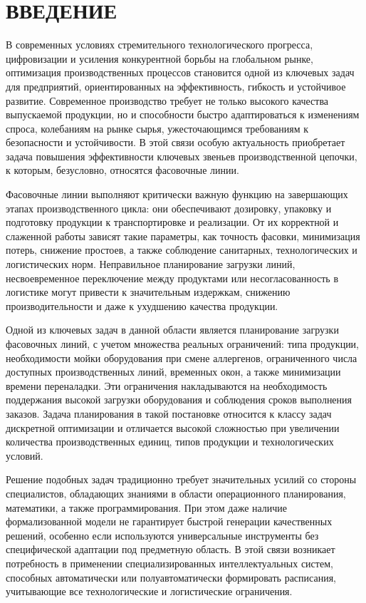 \chapter*{ВВЕДЕНИЕ}

В современных условиях стремительного технологического прогресса, цифровизации и усиления конкурентной борьбы на глобальном рынке, оптимизация производственных процессов становится одной из ключевых задач для предприятий, ориентированных на эффективность, гибкость и устойчивое развитие. Современное производство требует не только высокого качества выпускаемой продукции, но и способности быстро адаптироваться к изменениям спроса, колебаниям на рынке сырья, ужесточающимся требованиям к безопасности и устойчивости. В этой связи особую актуальность приобретает задача повышения эффективности ключевых звеньев производственной цепочки, к которым, безусловно, относятся фасовочные линии.

Фасовочные линии выполняют критически важную функцию на завершающих этапах производственного цикла: они обеспечивают дозировку, упаковку и подготовку продукции к транспортировке и реализации. От их корректной и слаженной работы зависят такие параметры, как точность фасовки, минимизация потерь, снижение простоев, а также соблюдение санитарных, технологических и логистических норм. Неправильное планирование загрузки линий, несвоевременное переключение между продуктами или несогласованность в логистике могут привести к значительным издержкам, снижению производительности и даже к ухудшению качества продукции.

Одной из ключевых задач в данной области является планирование загрузки фасовочных линий, с учетом множества реальных ограничений: типа продукции, необходимости мойки оборудования при смене аллергенов, ограниченного числа доступных производственных линий, временных окон, а также минимизации времени переналадки. Эти ограничения накладываются на необходимость поддержания высокой загрузки оборудования и соблюдения сроков выполнения заказов. Задача планирования в такой постановке относится к классу задач дискретной оптимизации и отличается высокой сложностью при увеличении количества производственных единиц, типов продукции и технологических условий.

Решение подобных задач традиционно требует значительных усилий со стороны специалистов, обладающих знаниями в области операционного планирования, математики, а также программирования. При этом даже наличие формализованной модели не гарантирует быстрой генерации качественных решений, особенно если используются универсальные инструменты без специфической адаптации под предметную область. В этой связи возникает потребность в применении специализированных интеллектуальных систем, способных автоматически или полуавтоматически формировать расписания, учитывающие все технологические и логистические ограничения.

